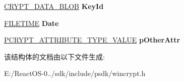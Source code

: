 \begin{DoxyCompactItemize}
\begin{tabbing}
\end{tabbing}\item 
\mbox{\label{struct___c_m_s_g___m_a_i_l___l_i_s_t___r_e_c_i_p_i_e_n_t___e_n_c_o_d_e___i_n_f_o_abb3d48f2e1d76b1c09add14ab89482fb}} 
\hyperlink{struct___c_r_y_p_t_o_a_p_i___b_l_o_b}{C\+R\+Y\+P\+T\+\_\+\+D\+A\+T\+A\+\_\+\+B\+L\+OB} {\bfseries Key\+Id}
\item 
\mbox{\label{struct___c_m_s_g___m_a_i_l___l_i_s_t___r_e_c_i_p_i_e_n_t___e_n_c_o_d_e___i_n_f_o_a0b1f5906b33fb91e82b04e76746e5fb7}} 
\hyperlink{struct___f_i_l_e_t_i_m_e}{F\+I\+L\+E\+T\+I\+ME} {\bfseries Date}
\item 
\mbox{\label{struct___c_m_s_g___m_a_i_l___l_i_s_t___r_e_c_i_p_i_e_n_t___e_n_c_o_d_e___i_n_f_o_a0881916364d4b051140c8e58e89415e8}} 
\hyperlink{struct___c_r_y_p_t___a_t_t_r_i_b_u_t_e___t_y_p_e___v_a_l_u_e}{P\+C\+R\+Y\+P\+T\+\_\+\+A\+T\+T\+R\+I\+B\+U\+T\+E\+\_\+\+T\+Y\+P\+E\+\_\+\+V\+A\+L\+UE} {\bfseries p\+Other\+Attr}
\end{DoxyCompactItemize}


该结构体的文档由以下文件生成\+:\begin{DoxyCompactItemize}
\item 
E\+:/\+React\+O\+S-\/0../sdk/include/psdk/wincrypt.\+h\end{DoxyCompactItemize}
